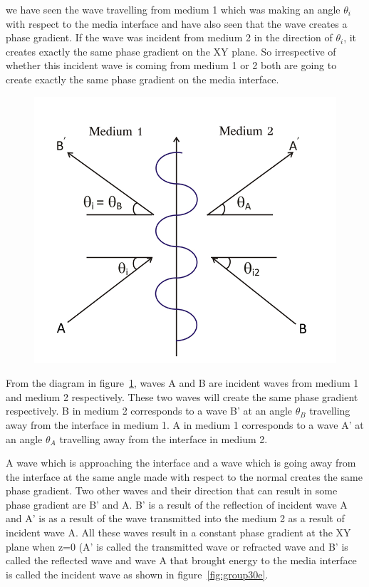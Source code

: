 we have seen the wave travelling from medium 1  which was making an angle $\theta_i$ with respect to the media interface and have also seen that the wave creates a phase gradient. If the wave was incident from medium 2 in the direction of $\theta_i$, it creates exactly the same phase gradient on the XY plane. So irrespective of whether this incident wave is coming from medium 1 or 2 both are going to create exactly the same phase gradient on the media interface.
\begin{figure}[h]
\centering
\includegraphics[width=.7\linewidth]{./graphics/incident_and_reflected_waves}
\caption{}
\label{fig:group30d---copy}
\end{figure}

From the diagram in figure~\ref{fig:group30d---copy}, waves A and B are incident waves from medium 1 and medium 2 respectively. These two waves will create the same phase gradient respectively. B in medium 2 corresponds to a wave B'  at an angle $\theta_B$ travelling away from the interface in medium 1. A in medium 1 corresponds to a wave A' at an angle $\theta_A$ travelling away from the interface in medium 2.

A wave which is approaching the interface and a wave which is going away from the interface at the same angle made with respect to the normal creates the same phase gradient. Two other waves and their direction that can result in some phase gradient are B'
and A. B' is a result of the reflection of incident wave A and A' is as a result of the wave transmitted into the medium 2 as a result of incident wave A. All these waves result in a constant phase gradient at the XY plane when z=0 (A' is called the transmitted wave or refracted wave and B' is called the reflected wave and wave A that brought energy to the media interface is called the incident wave as shown in figure~\ref{fig:group30e}.

